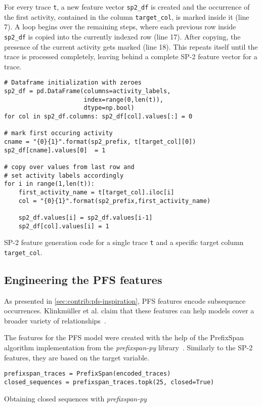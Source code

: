 For every trace \verb=t=, a new feature vector \verb=sp2_df= is created and the occurrence of the first activity, contained in the column \verb=target_col=, is marked inside it (line 7). A loop begins over the remaining steps, where each previous row inside \texttt{sp2\_df} is copied into the currently indexed row (line 17). After copying, the presence of the current activity gets marked (line 18). This repeats itself until the trace is processed completely, leaving behind a complete SP-2 feature vector for a trace.

\begin{listing}[ht]
\begin{verbatim}
# Dataframe initialization with zeroes
sp2_df = pd.DataFrame(columns=activity_labels,
                      index=range(0,len(t)),
                      dtype=np.bool)
for col in sp2_df.columns: sp2_df[col].values[:] = 0

# mark first occuring activity
cname = "{0}{1}".format(sp2_prefix, t[target_col][0])
sp2_df[cname].values[0]  = 1

# copy over values from last row and
# set activity labels accordingly
for i in range(1,len(t)):
    first_activity_name = t[target_col].iloc[i]
    col = "{0}{1}".format(sp2_prefix,first_activity_name)

    sp2_df.values[i] = sp2_df.values[i-1]
    sp2_df[col].values[i] = 1
\end{verbatim}
\caption[SP-2 feature generation code]{SP-2 feature generation code for a single trace \texttt{t} and a specific target column \texttt{target\_col}.}
\label{lst:sp2-generation}
\end{listing}

\FloatBarrier
\subsection*{Engineering the PFS features}
As presented in \autoref{sec:contrib:pfs-inspiration}, PFS features encode subsequence occurrences. Klinkmüller et al. claim that these features can help models cover a broader variety of relationships~\cite{klinkmuller2018reliablemonitoring}.

The features for the PFS model were created with the help of the PrefixSpan algorithm implementation from the \textit{prefixspan-py} library~\cite{web:prefixspan-py}. Similarly to the SP-2 features, they are based on the target variable.

\begin{listing}[ht]
\begin{verbatim}
prefixspan_traces = PrefixSpan(encoded_traces)
closed_sequences = prefixspan_traces.topk(25, closed=True)
\end{verbatim}
\caption{Obtaining closed sequences with \textit{prefixspan-py}}
\label{lst:pfs-mining}
\end{listing}

